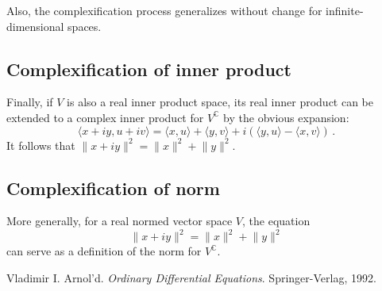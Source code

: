 \documentclass[12pt]{article}
\newcommand{\Vc}{V^\mathbb{C}}
\providecommand{\norm}[1]{\lVert#1\rVert}
\begin{document}
Also, the complexification process generalizes without change for infinite-dimensional 
spaces.

\subsection{Complexification of inner product}

Finally,
if $V$ is also a real inner product space,
its real inner product can be extended to a complex inner product for $\Vc$ by
the obvious expansion:
\[
\langle x+iy, u+iv \rangle = \langle x, u \rangle + \langle y, v \rangle + i(\langle y, u \rangle - \langle x, v \rangle)\,.
\]
It follows that $\norm{x+iy}^2 = \norm{x}^2 + \norm{y}^2$.

\subsection{Complexification of norm}

More generally, for a real normed vector space $V$, 
the equation 
\[
\norm{x+iy}^2 = \norm{x}^2 + \norm{y}^2
\]
can serve as a definition of the norm for $\Vc$.

\begin{thebibliography}{3}
 Vladimir I. Arnol'd. {\it Ordinary Differential Equations}. Springer-Verlag, 1992.
\end{thebibliography}
\end{document}
